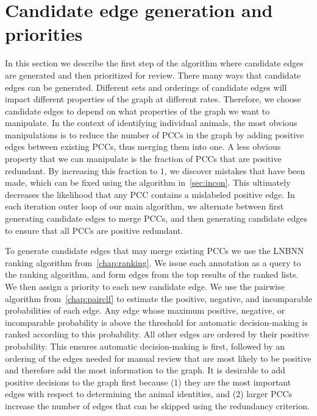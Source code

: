 

\section{Candidate edge generation and priorities}\label{sec:cand}

In this section we describe the first step of the algorithm where candidate edges are generated and then
  prioritized for review.
There many ways that candidate edges can be generated.
Different sets and orderings of candidate edges will impact different properties of the graph at different rates.
Therefore, we choose candidate edges to depend on what properties of the graph we want to manipulate.
In the context of identifying individual animals, the most obvious manipulations is to reduce the number of PCCs
  in the graph by adding positive edges between existing PCCs, thus merging them into one.
A less obvious property that we can manipulate is the fraction of PCCs that are positive redundant.
By increasing this fraction to $1$, we discover mistakes that have been made, which can be fixed using the
  algorithm in~\cref{sec:incon}.
This ultimately decreases the likelihood that any PCC contains a mislabeled positive edge.
In each iteration outer loop of our main algorithm, we alternate between first generating candidate edges to
  merge PCCs, and then generating candidate edges to ensure that all PCCs are positive redundant.

To generate candidate edges that may merge existing PCCs we use the LNBNN ranking algorithm
  from~\cref{chap:ranking}.
We issue each annotation as a query to the ranking algorithm, and form edges from the top results of the ranked
  lists.
We then assign a priority to each new candidate edge.
We use the pairwise algorithm from~\cref{chap:pairclf} to estimate the positive, negative, and incomparable
  probabilities of each edge.
Any edge whose maximum positive, negative, or incomparable probability is above the threshold for automatic
  decision-making is ranked according to this probability.
All other edges are ordered by their positive probability.
This ensures automatic decision-making is first, followed by an ordering of the edges needed for manual review
  that are most likely to be positive and therefore add the most information to the graph.
It is desirable to add positive decisions to the graph first because
(1) they are the most important edges with respect to determining the animal identities, and
(2) larger PCCs increase the number of edges that can be skipped using the redundancy criterion.

